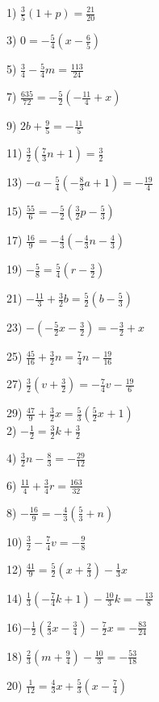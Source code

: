 \documentclass[11pt]{book}
\theoremstyle{definition}  %
\begin{document}
\begin{multicols}{2}
  1) $\frac{3}{5} (1 + p) = \frac{21}{20}$
  
  3) $0 = - \frac{5}{4} (x - \frac{6}{5})$
  
  5) $\frac{3}{4} - \frac{5}{4} m = \frac{113}{24}$
  
  7) $\frac{635}{72} = - \frac{5}{2} (- \frac{11}{4} + x)$
  
  9) $2 b + \frac{9}{5} = - \frac{11}{5}$
  
  11) $\frac{3}{2} (\frac{7}{3} n + 1) = \frac{3}{2}$
  
  13) $- a - \frac{5}{4} (- \frac{8}{3} a + 1) = - \frac{19}{4}$
  
  15) $\frac{55}{6} = - \frac{5}{2} (\frac{3}{2} p - \frac{5}{3})$
  
  17) $\frac{16}{9} = - \frac{4}{3} (- \frac{4}{3} n - \frac{4}{3})$
  
  19) $- \frac{5}{8} = \frac{5}{4} (r - \frac{3}{2})$
  
  21) $- \frac{11}{3} + \frac{3}{2} b = \frac{5}{2} (b - \frac{5}{3})$
  
  23) $- (- \frac{5}{2} x - \frac{3}{2}) = - \frac{3}{2} + x$
  
  25) $\frac{45}{16} + \frac{3}{2} n = \frac{7}{4} n - \frac{19}{16}$
  
  27) $\frac{3}{2} (v + \frac{3}{2}) = - \frac{7}{4} v - \frac{19}{6}$
  
  29) $\frac{47}{9} + \frac{3}{2} x = \frac{5}{3} (\frac{5}{2} x_{} + 1)$\\
  
  2) $- \frac{1}{2} = \frac{3}{2} k + \frac{3}{2}$
  
  4) $\frac{3}{2} n - \frac{8}{3} = - \frac{29}{12}$
  
  6) $\frac{11}{4} + \frac{3}{4} r = \frac{163}{32}$
  
  8) $- \frac{16}{9} = - \frac{4}{3} (\frac{5}{3} + n)$
  
  10) $\frac{3}{2} - \frac{7}{4} v = - \frac{9}{8}$
  
  12) $\frac{41}{9} = \frac{5}{2} (x + \frac{2}{3}) - \frac{1}{3} x$
  
  14) $\frac{1}{3} (- \frac{7}{4} k + 1) - \frac{10}{3} k = - \frac{13}{8}$
  
  16)$- \frac{1}{2} (\frac{2}{3} x - \frac{3}{4}) - \frac{7}{2} x = -
  \frac{83}{24}$
  
  18) $\frac{2}{3} (m + \frac{9}{4}) - \frac{10}{3} = - \frac{53}{18}$
  
  20) $\frac{1}{12} = \frac{4}{3} x + \frac{5}{3} (x - \frac{7}{4})$
  

\end{multicols}
\end{document}
